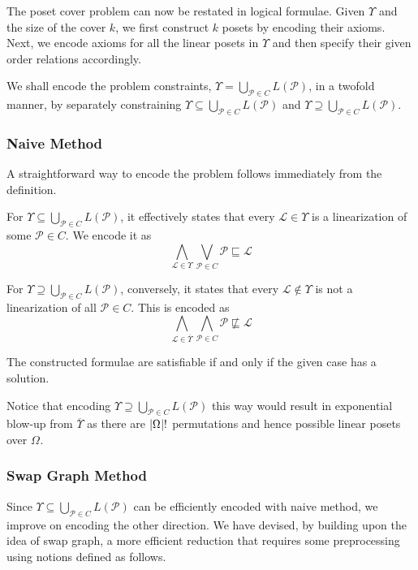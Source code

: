 \documentclass[12pt]{llncs}
\DeclarePairedDelimiter{\abs}{\lvert}{\rvert}
\newcommand{\poset}[1]{\mathcal{#1}}
\newcommand{\uni}[1][]{\Omega_{#1}}
\newcommand{\lang}[1]{L(#1)}
\newcommand{\lext}{\sqsubseteq}
\newcommand{\complmt}[1]{\overline{#1}}
\begin{document}
The poset cover problem can now be restated in logical formulae. Given $\Upsilon$ and the size of the cover $k$, we first construct $k$ posets by encoding their axioms. Next, we encode axioms for all the linear posets in $\Upsilon$ and then specify their given order relations accordingly.

We shall encode the problem constraints, $\Upsilon = \bigcup_{\poset{P} \in C} \lang{\poset{P}}$, in a twofold manner, by separately constraining $\Upsilon \subseteq \bigcup_{\poset{P} \in C} \lang{\poset{P}}$ and $\Upsilon \supseteq \bigcup_{\poset{P} \in C} \lang{\poset{P}}$.

\subsubsection{Naive Method} A straightforward way to encode the problem follows immediately from the definition.

For $\Upsilon \subseteq \bigcup_{\poset{P} \in C} \lang{\poset{P}}$, it effectively states that every $\poset{L} \!\in\! \Upsilon$ is a linearization of some $\poset{P} \!\in\! C$. We encode it as
\[
\bigwedge_{\poset{L} \in \Upsilon} \bigvee_{\poset{P} \in C} \poset{P} \lext \poset{L}
\]

For $\Upsilon \supseteq \bigcup_{\poset{P} \in C} \lang{\poset{P}}$, conversely, it states that every $\poset{L} \!\notin\! \Upsilon$ is not a linearization of all $\poset{P} \!\in\! C$. This is encoded as
\[
\bigwedge_{\poset{L} \in \complmt{\Upsilon}} \bigwedge_{\poset{P} \in C} \poset{P} \not\lext \poset{L}
\]

\begin{theorem}
    The constructed formulae are satisfiable if and only if the given case has a solution.
\end{theorem}

Notice that encoding $\Upsilon \supseteq \bigcup_{\poset{P} \in C} \lang{\poset{P}}$ this way would result in exponential blow-up from $\complmt{\Upsilon}$ as there are $\abs{\uni}!$ permutations and hence possible linear posets over $\uni$.

\subsubsection{Swap Graph Method}
Since $\Upsilon \subseteq \bigcup_{\poset{P} \in C} \lang{\poset{P}}$ can be efficiently encoded with naive method, we improve on encoding the other direction. We have devised, by building upon the idea of swap graph, a more efficient reduction that requires some preprocessing using notions defined as follows.
\end{document}
